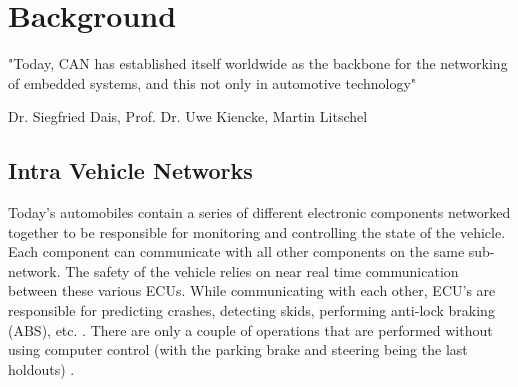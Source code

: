 
\chapter{Background}
\label{chap:background}

\epigraph{"Today, CAN has established itself worldwide as the backbone for the networking of embedded systems, and this not only in automotive technology"}{Dr. Siegfried Dais, Prof. Dr. Uwe Kiencke, Martin Litschel}

\section{Intra Vehicle Networks}
\label{sec:vni}
Today's automobiles contain a series of different electronic components networked together to be responsible for monitoring and controlling the state of the vehicle. Each component can communicate with all other components on the same sub-network. The safety of the vehicle relies on near real time communication between these various ECUs. While communicating with each other, ECU's are responsible for predicting crashes, detecting skids, performing anti-lock braking (ABS), etc. \cite{Yadav16}. There are only a couple of operations that are performed without using computer control (with the parking brake and steering being the last holdouts) \cite{Kosher}. 

